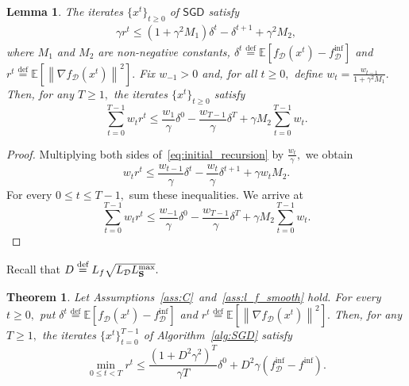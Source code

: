 \documentclass{article}
\newcommand{\eqdef}{\stackrel{\text{def}}{=}}
\newtheorem{lemma}{Lemma}
\newtheorem{theorem}{Theorem}
\theoremstyle{plain}
\newcommand{\tf}{f_{\mathcal{D}}}
\newcommand{\mS}{{\bf S}}
\theoremstyle{plain}
\theoremstyle{definition}
\theoremstyle{remark}
\begin{document}
\begin{lemma} \label{lemma:noncvx_weighted}
 The iterates $\{x^t\}_{t\geq 0}$ of $\mathsf{SGD}$ satisfy
	\begin{equation}\label{eq:initial_recursion}
		\begin{split}
			\gamma r^t \leq \left(1 + \gamma^2 M_1\right)\delta^t - \delta^{t+1} + \gamma^2 M_2,
		\end{split}
	\end{equation}
	where $M_1$ and $M_2$ are non-negative constants, $\delta^t\eqdef\mathbb{E}\left[\tf(x^t)-\tf^{\inf}\right]$ and $r^t\eqdef\mathbb{E}\left[\left\|\nabla \tf(x^t)\right\|^2\right].$ Fix $w_{-1}>0$ and, for all $t\geq 0,$ define $w_t=\frac{w_{t-1}}{1+\gamma^2M_1}.$ Then, for any $T\geq 1,$ the iterates $\{x^t\}_{t\geq 0}$ satisfy
	\begin{equation*}
		\sum_{t=0}^{T-1}w_tr^t \leq \frac{w_1}{\gamma}\delta^0 - \frac{w_{T-1}}{\gamma}\delta^T + \gamma M_2\sum_{t=0}^{T-1}w_t.
	\end{equation*}
\end{lemma}
\begin{proof}
	Multiplying both sides of~\eqref{eq:initial_recursion} by $\frac{w_t}{\gamma},$ we obtain
	\begin{equation*}
		w_t r^t\leq\frac{w_{t-1}}{\gamma}\delta^t - \frac{w_t}{\gamma}\delta^{t+1} + \gamma w_tM_2.
	\end{equation*}
	For every $0\leq t\leq T-1,$ sum these inequalities. We arrive at
	\begin{equation*}
		\sum_{t=0}^{T-1}w_tr^t\leq \frac{w_{-1}}{\gamma}\delta^0 - \frac{w_{T-1}}{\gamma}\delta^{T} + \gamma M_2\sum_{t=0}^{T-1}w_t.
	\end{equation*}
\end{proof}
Recall that $D \eqdef L_f \sqrt{L_{\mathcal{D}}L_{\mS}^{\max} }.$
\begin{theorem}
	Let Assumptions~\ref{ass:C}~and~\ref{ass:l_f_smooth} hold. For every $t\geq 0,$ put $\delta^t\eqdef\mathbb{E}\left[\tf(x^t)-\tf^{\inf}\right]$ and $r^t\eqdef\mathbb{E}\left[\left\|\nabla \tf(x^t)\right\|^2\right].$ Then, for any $T\geq 1,$ the iterates $\{x^t\}_{t=0}^{T-1}$ of Algorithm~\ref{alg:SGD} satisfy
	\begin{equation}\label{eq:main_noncvx_convergence_basicsgd}
		\min_{0 \leq t < T}r^t\leq \frac{\left(1+D^2\gamma^2\right)^T}{\gamma T}\delta^0 + D^2  \gamma \left(\tf^{\inf} - f^{\inf}\right).
	\end{equation}
\end{theorem}
\end{document}

